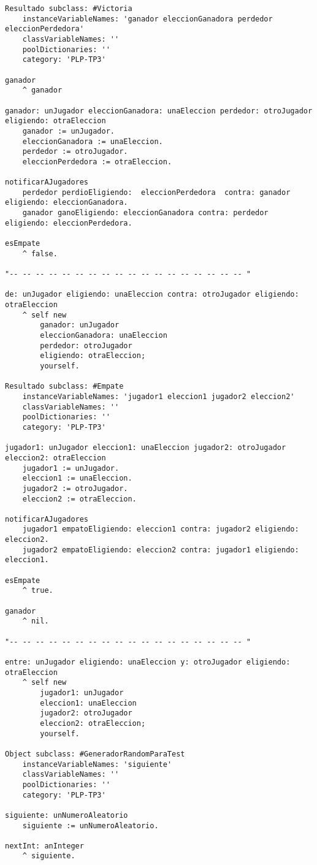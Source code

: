 \documentclass[10pt, a4paper,english,spanish,hidelinks]{article}
\begin{document}
\begin{verbatim}
Resultado subclass: #Victoria
	instanceVariableNames: 'ganador eleccionGanadora perdedor eleccionPerdedora'
	classVariableNames: ''
	poolDictionaries: ''
	category: 'PLP-TP3'

ganador
	^ ganador 

ganador: unJugador eleccionGanadora: unaEleccion perdedor: otroJugador eligiendo: otraEleccion 
	ganador := unJugador.
	eleccionGanadora := unaEleccion.
	perdedor := otroJugador.
	eleccionPerdedora := otraEleccion. 

notificarAJugadores
	perdedor perdioEligiendo:  eleccionPerdedora  contra: ganador eligiendo: eleccionGanadora.
	ganador ganoEligiendo: eleccionGanadora contra: perdedor eligiendo: eleccionPerdedora.  

esEmpate
	^ false. 

"-- -- -- -- -- -- -- -- -- -- -- -- -- -- -- -- -- -- "

de: unJugador eligiendo: unaEleccion contra: otroJugador eligiendo: otraEleccion 
	^ self new 
		ganador: unJugador
		eleccionGanadora: unaEleccion
		perdedor: otroJugador
		eligiendo: otraEleccion;
		yourself. 

Resultado subclass: #Empate
	instanceVariableNames: 'jugador1 eleccion1 jugador2 eleccion2'
	classVariableNames: ''
	poolDictionaries: ''
	category: 'PLP-TP3'

jugador1: unJugador eleccion1: unaEleccion jugador2: otroJugador eleccion2: otraEleccion 
	jugador1 := unJugador.
	eleccion1 := unaEleccion.
	jugador2 := otroJugador.
	eleccion2 := otraEleccion. 

notificarAJugadores
	jugador1 empatoEligiendo: eleccion1 contra: jugador2 eligiendo: eleccion2. 
	jugador2 empatoEligiendo: eleccion2 contra: jugador1 eligiendo: eleccion1. 

esEmpate
	^ true. 

ganador
	^ nil. 

"-- -- -- -- -- -- -- -- -- -- -- -- -- -- -- -- -- -- "

entre: unJugador eligiendo: unaEleccion y: otroJugador eligiendo: otraEleccion 
	^ self new
		jugador1: unJugador
		eleccion1: unaEleccion
		jugador2: otroJugador
		eleccion2: otraEleccion;
		yourself. 

Object subclass: #GeneradorRandomParaTest
	instanceVariableNames: 'siguiente'
	classVariableNames: ''
	poolDictionaries: ''
	category: 'PLP-TP3'

siguiente: unNumeroAleatorio
	siguiente := unNumeroAleatorio. 

nextInt: anInteger 
	^ siguiente. 


\end{verbatim}
\end{document}
